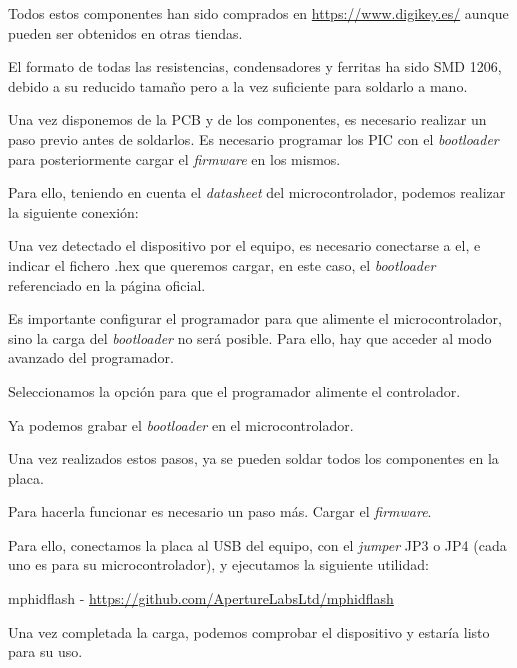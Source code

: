 Todos estos componentes han sido comprados en \url{https://www.digikey.es/} aunque pueden ser obtenidos en otras tiendas.

El formato de todas las resistencias, condensadores y ferritas ha sido SMD 1206, debido a su reducido tamaño pero a la vez suficiente para soldarlo a mano.

Una vez disponemos de la PCB y de los componentes, es necesario realizar un paso previo antes de soldarlos. Es necesario programar los PIC con el \emph{bootloader} para posteriormente cargar el \emph{firmware} en los mismos.

Para ello, teniendo en cuenta el \emph{datasheet}\cite{datasheet} del microcontrolador, podemos realizar la siguiente conexión:






Una vez detectado el dispositivo por el equipo, es necesario conectarse a el, e indicar el fichero .hex\cite{hexfile} que queremos cargar, en este caso, el \emph{bootloader} referenciado en la página oficial.

Es importante configurar el programador para que alimente el microcontrolador, sino la carga del \emph{bootloader} no será posible. Para ello, hay que acceder al modo avanzado del programador.


Seleccionamos la opción para que el programador alimente el controlador.

Ya podemos grabar el \emph{bootloader} en el microcontrolador.

Una vez realizados estos pasos, ya se pueden soldar todos los componentes en la placa.

Para hacerla funcionar es necesario un paso más. Cargar el \emph{firmware}.

Para ello, conectamos la placa al USB del equipo, con el \emph{jumper} JP3 o JP4 (cada uno es para su microcontrolador), y ejecutamos la siguiente utilidad:

mphidflash - \url{https://github.com/ApertureLabsLtd/mphidflash}



Una vez completada la carga, podemos comprobar el dispositivo y estaría listo para su uso.
